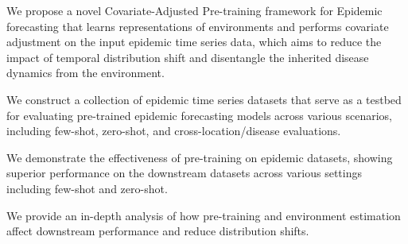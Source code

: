 \begin{compactenum}[\textbullet]

    \item We propose a novel Covariate-Adjusted Pre-training framework for Epidemic forecasting that learns representations of environments and performs covariate adjustment on the input epidemic time series data, which aims to reduce the impact of temporal distribution shift and disentangle the inherited disease dynamics from the environment. 

    \item We construct a collection of epidemic time series datasets that serve as a testbed for evaluating pre-trained epidemic forecasting models across various scenarios, including few-shot, zero-shot, and cross-location/disease evaluations.



    
    \item We demonstrate the effectiveness of pre-training on epidemic datasets, showing superior performance on the downstream datasets across various settings including few-shot and zero-shot. 

    \item We provide an in-depth analysis of how pre-training and environment estimation affect downstream performance and reduce distribution shifts.


    
    
\end{compactenum}




